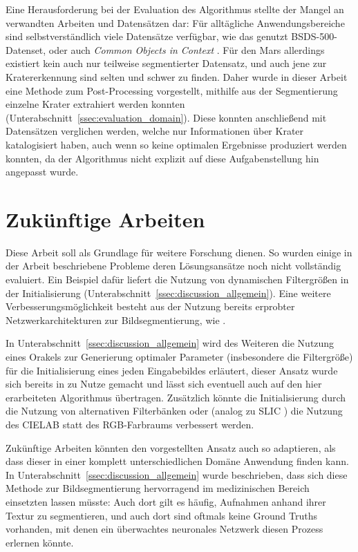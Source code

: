 Eine Herausforderung bei der Evaluation des Algorithmus stellte der Mangel an verwandten Arbeiten und Datensätzen dar: Für alltägliche Anwendungsbereiche sind selbstverständlich viele Datensätze verfügbar, wie das genutzt BSDS-500-Datenset, oder auch \textit{Common Objects in Context} \cite{lin_14}. Für den Mars allerdings existiert kein auch nur teilweise segmentierter Datensatz, und auch jene zur Kratererkennung sind selten und schwer zu finden. Daher wurde in dieser Arbeit eine Methode zum Post-Processing vorgestellt, mithilfe aus der Segmentierung einzelne Krater extrahiert werden konnten (\vgl Unterabschnitt~\ref{ssec:evaluation_domain}). Diese konnten anschließend mit Datensätzen verglichen werden, welche nur Informationen über Krater katalogisiert haben, auch wenn so keine optimalen Ergebnisse produziert werden konnten, da der Algorithmus nicht explizit auf diese Aufgabenstellung hin angepasst wurde.

\section{Zukünftige Arbeiten}

Diese Arbeit soll als Grundlage für weitere Forschung dienen. So wurden einige in der Arbeit beschriebene Probleme \bzw deren Lösungsansätze noch nicht vollständig evaluiert. Ein Beispiel dafür liefert die Nutzung von dynamischen Filtergrößen in der Initialisierung (\vgl Unterabschnitt~\ref{ssec:discussion_allgemein}). Eine weitere Verbesserungsmöglichkeit besteht aus der Nutzung bereits erprobter Netzwerkarchitekturen zur Bildsegmentierung, wie \bspw \cite{ronneberger_15}.

In Unterabschnitt~\ref{ssec:discussion_allgemein} wird des Weiteren die Nutzung eines Orakels zur Generierung optimaler Parameter (insbesondere die Filtergröße) für die Initialisierung eines jeden Eingabebildes erläutert, dieser Ansatz wurde sich bereits in \cite{arbelaez_10} zu Nutze gemacht und lässt sich eventuell auch auf den hier erarbeiteten Algorithmus übertragen. Zusätzlich könnte die Initialisierung durch die Nutzung von alternativen Filterbänken oder (analog zu SLIC \cite{achanta_10}) die Nutzung des CIELAB statt des RGB-Farbraums verbessert werden.

Zukünftige Arbeiten könnten den vorgestellten Ansatz auch so adaptieren, als dass dieser in einer komplett unterschiedlichen Domäne Anwendung finden kann. In Unterabschnitt~\ref{ssec:discussion_allgemein} wurde beschrieben, dass sich diese Methode zur Bildsegmentierung hervorragend im medizinischen Bereich einsetzten lassen müsste: Auch dort gilt es häufig, Aufnahmen anhand ihrer Textur zu segmentieren, und auch dort sind oftmals keine Ground Truths vorhanden, mit denen ein überwachtes neuronales Netzwerk diesen Prozess erlernen könnte.

